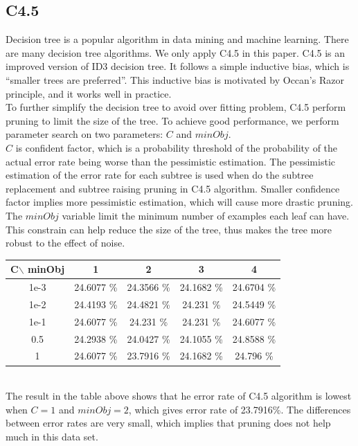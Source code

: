 \documentclass[a4paper,11pt]{article}
\begin{document}
\subsection{C4.5}
Decision tree is a popular algorithm in data mining and machine learning. There are many decision tree algorithms. We only apply C4.5 in this paper. C4.5 is an improved version of ID3 decision tree. It follows a simple inductive bias, which is ``smaller trees are preferred''. This inductive bias is motivated by Occan's Razor principle, and it works well in practice.\\
To further simplify the decision tree to avoid over fitting problem, C4.5 perform pruning to limit the size of the tree. To achieve good performance, we perform parameter search on two parameters: $C$ and $minObj$. \\
$C$ is confident factor, which is a probability threshold of the probability of the actual error rate being worse than the pessimistic estimation\cite{morgan.kaufmann}. The pessimistic estimation of the error rate for each subtree is used when do the subtree replacement and subtree raising pruning in C4.5 algorithm. Smaller confidence factor implies more pessimistic estimation, which will cause more drastic pruning.\\
The $minObj$ variable limit the minimum number of examples each leaf can have. This constrain can help reduce the size of the tree, thus makes the tree more robust to the effect of noise.
\vspace{0.5cm}\\
\begin{tabular}{c|c c c c}
C$\backslash$ minObj	&1		&2		&3		&4\\
\hline \hline
1e-3 	&24.6077 \%	&24.3566 \%	&24.1682 \%	 &24.6704 \%\\
1e-2	&24.4193 \%	 &24.4821 \%	&24.231  \%	 &24.5449 \%\\
1e-1	&24.6077 \%	&24.231  \%	&24.231  \%	 &24.6077 \%\\
0.5 &24.2938 \%     &24.0427 \% &24.1055 \%  &24.8588 \%\\
1	&24.6077 \%	    &23.7916 \%	&24.1682 \%	 &24.796  \%\\
\end{tabular}
\vspace{0.5cm}\\
The result in the table above shows that he error rate of C4.5 algorithm is lowest when $C=1$ and $minObj=2$, which gives error rate of 23.7916\%. The differences between error rates are very small, which implies that pruning does not help much in this data set.\\
\end{document}
